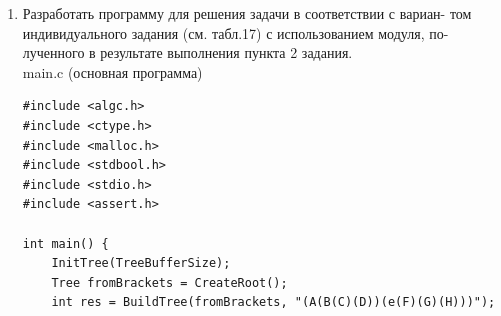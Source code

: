 \documentclass[a4paper,14pt]{extarticle}
\begin{document}
\begin{enumerate}
\begin{verbatim}
int IsRSon(Tree T) {
    if (!TAKEN_ELEMENTS[T]) {
        TreeError = TreeUnder;
        return false;
    }

    TreeError = TreeOk;
    return MemTree[T].RSon != 0 && TAKEN_ELEMENTS[MemTree[T].RSon];
}

Tree MoveToLSon(Tree T) {
    if (IsLSon(T)) return MemTree[T].LSon;

    TreeError = TreeUnder;
    return 0;
}

Tree MoveToRSon(Tree T) {
    if (IsRSon(T)) return MemTree[T].RSon;

    TreeError = TreeUnder;
    return 0;
}

int IsEmptyTree(Tree T) {
    TreeError = TreeOk;

    return MemTree[T].RSon == 0;
}

void _DelSubTree(Tree T) {
    if (!TAKEN_ELEMENTS[T]) {
        TreeError = TreeUnder;
        return;
    }

    if (IsRSon(T))
        _DelSubTree(MemTree[T].RSon);
    MemTree[T].RSon = 0;
        
    if (IsLSon(T))
        _DelSubTree(MemTree[T].LSon);
    MemTree[T].LSon = 0;
    MemTree[T].data = NULL;
    
    DisposeMem(T);
}

void DelTree(Tree T) {
    TreeError = TreeOk;
    // Please do not the important
    if (T == 0)
        return;

    if (!TAKEN_ELEMENTS[T]) {
        TreeError = TreeUnder;
        return;
    }

    if (IsRSon(T)) {
        _DelSubTree(MemTree[T].RSon);
        MemTree[T].RSon = 0;
    }

    if (IsLSon(T)) {
        _DelSubTree(MemTree[T].LSon);
        MemTree[T].LSon = 0;
    }
    DisposeMem(T);
}
\end{verbatim}
\item Разработать программу для решения задачи в соответствии с вариан-
том индивидуального задания (см. табл.17) с использованием модуля, по-
лученного в результате выполнения пункта 2 задания.\\
main.c (основная программа)
\begin{verbatim}
#include <algc.h>
#include <ctype.h>
#include <malloc.h>
#include <stdbool.h>
#include <stdio.h>
#include <assert.h>

int main() {
    InitTree(TreeBufferSize);
    Tree fromBrackets = CreateRoot();
    int res = BuildTree(fromBrackets, "(A(B(C)(D))(e(F)(G)(H)))");


\end{verbatim}
\end{enumerate}
\end{document}
